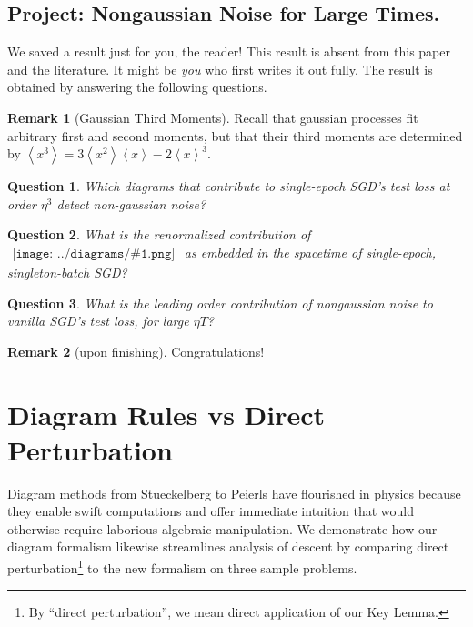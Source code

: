 \documentclass{article}
\theoremstyle{plain}
\newtheorem*{quest*}{Question}
\theoremstyle{definition}
\newtheorem*{rmk*}{Remark}
\newcommand{\wang}[1]{\left\langle#1\right\rangle}
\newcommand{\sdia}[1]{\begin{gathered}\texttt{[image: ../diagrams/\#1.png]}\end{gathered}}
\begin{document}
    \subsection{
        Project: Nongaussian Noise for Large Times.
    }
        We saved a result just for you, the reader!  This result is absent from
        this paper and the literature.  It might be \emph{you} who first writes
        it out fully.  The result is obtained by answering the following
        questions.

        \begin{rmk*}[Gaussian Third Moments]
            Recall that gaussian processes fit arbitrary first and second
            moments, but that their third moments are determined by 
            $\wang{x^3} = 3\wang{x^2}\wang{x} - 2\wang{x}^3$.
        \end{rmk*}
        \begin{quest*}
            Which diagrams that contribute to single-epoch SGD's test loss at
            order $\eta^3$ detect non-gaussian noise?
        \end{quest*}

        \begin{quest*}
            What is the renormalized contribution of $\sdia{(012-3)(03-13-23)}$
            as embedded in the spacetime of single-epoch, singleton-batch SGD?
        \end{quest*}
       
        \begin{quest*}
            What is the leading order contribution of nongaussian noise to 
            vanilla SGD's test loss, for large $\eta T$?
        \end{quest*}
        \begin{rmk*}[upon finishing]
            Congratulations!
        \end{rmk*}

      
\section{Diagram Rules vs Direct Perturbation} \label{sect:compare}
    Diagram methods from Stueckelberg to Peierls have flourished in physics
    because they enable swift computations and offer immediate intuition that
    would otherwise require laborious algebraic manipulation.  We demonstrate
    how our diagram formalism likewise streamlines analysis of descent by
    comparing direct perturbation\footnote{
        By ``direct perturbation'', we mean direct application of our Key
        Lemma.
    }
    to the new formalism on three sample problems.
\end{document}
